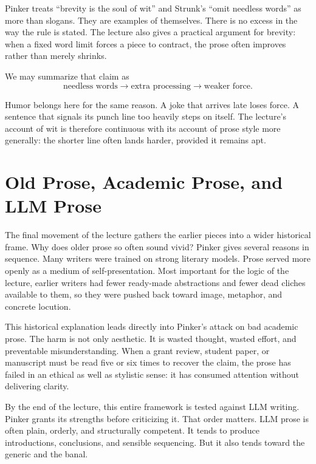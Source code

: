 Pinker treats ``brevity is the soul of wit'' and Strunk's ``omit needless words'' as more than slogans. They are examples of themselves. There is no excess in the way the rule is stated. The lecture also gives a practical argument for brevity: when a fixed word limit forces a piece to contract, the prose often improves rather than merely shrinks.

We may summarize that claim as
\begin{equation}
\text{needless words} \to \text{extra processing} \to \text{weaker force}.
\end{equation}

Humor belongs here for the same reason. A joke that arrives late loses force. A sentence that signals its punch line too heavily steps on itself. The lecture's account of wit is therefore continuous with its account of prose style more generally: the shorter line often lands harder, provided it remains apt.

\section{Old Prose, Academic Prose, and LLM Prose}

The final movement of the lecture gathers the earlier pieces into a wider historical frame. Why does older prose so often sound vivid? Pinker gives several reasons in sequence. Many writers were trained on strong literary models. Prose served more openly as a medium of self-presentation. Most important for the logic of the lecture, earlier writers had fewer ready-made abstractions and fewer dead cliches available to them, so they were pushed back toward image, metaphor, and concrete locution.

This historical explanation leads directly into Pinker's attack on bad academic prose. The harm is not only aesthetic. It is wasted thought, wasted effort, and preventable misunderstanding. When a grant review, student paper, or manuscript must be read five or six times to recover the claim, the prose has failed in an ethical as well as stylistic sense: it has consumed attention without delivering clarity.

By the end of the lecture, this entire framework is tested against LLM writing. Pinker grants its strengths before criticizing it. That order matters. LLM prose is often plain, orderly, and structurally competent. It tends to produce introductions, conclusions, and sensible sequencing. But it also tends toward the generic and the banal.

